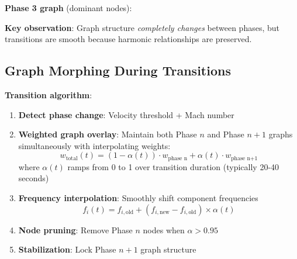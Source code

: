 \documentclass[12pt,a4paper]{article}
\begin{document}
\textbf{Phase 3 graph} (dominant nodes):
\begin{center}
\end{center}

\textbf{Key observation}: Graph structure \textit{completely changes} between phases, but transitions are smooth because harmonic relationships are preserved.

\subsection{Graph Morphing During Transitions}

\textbf{Transition algorithm}:

\begin{enumerate}
\item \textbf{Detect phase change}: Velocity threshold + Mach number
\item \textbf{Weighted graph overlay}: Maintain both Phase $n$ and Phase $n+1$ graphs simultaneously with interpolating weights:
\begin{equation}
w_{\text{total}}(t) = (1-\alpha(t)) \cdot w_{\text{phase n}} + \alpha(t) \cdot w_{\text{phase n+1}}
\end{equation}
where $\alpha(t)$ ramps from 0 to 1 over transition duration (typically 20-40 seconds)

\item \textbf{Frequency interpolation}: Smoothly shift component frequencies
\begin{equation}
f_i(t) = f_{i,\text{old}} + (f_{i,\text{new}} - f_{i,\text{old}}) \times \alpha(t)
\end{equation}

\item \textbf{Node pruning}: Remove Phase $n$ nodes when $\alpha > 0.95$
\item \textbf{Stabilization}: Lock Phase $n+1$ graph structure
\end{enumerate}
\end{document}
